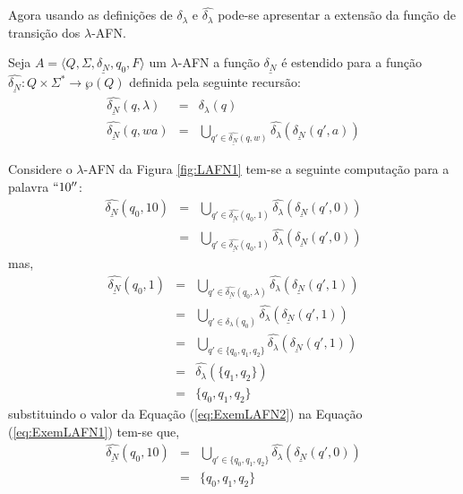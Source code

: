 Agora usando as definições de $\delta_\lambda$ e $\widehat{\delta_\lambda}$ pode-se apresentar a extensão da função de transição dos $\lambda$-AFN.

\begin{definition}\label{def:FuncaoLDeltaNDEstendida}
	Seja $A = \langle Q, \Sigma, \underline{\delta_N}, q_0, F\rangle$  um $\lambda$-AFN a função $\underline{\delta_N}$ é estendido para a função $\widehat{\underline{\delta_N}}: Q \times \Sigma^* \rightarrow \wp(Q)$ definida pela seguinte recursão:
	\begin{eqnarray}\label{eq:FuncaoLDeltaNDEstendida}
		\widehat{\underline{\delta_N}}(q, \lambda)& = &  \delta_\lambda(q)\\
		\widehat{\underline{\delta_N}}(q, wa) & = & \bigcup_{q' \in \widehat{\underline{\delta_N}}(q, w)} \widehat{\delta_\lambda}(\underline{\delta_N}(q', a))
	\end{eqnarray}
\end{definition}

\begin{example}
	Considere o $\lambda$-AFN da Figura \ref{fig:LAFN1} tem-se a seguinte computação para a palavra $``10''$:
	\begin{eqnarray}\label{eq:ExemLAFN1}
		\widehat{\underline{\delta_N}}(q_0, 10) & = & \bigcup_{q' \in \widehat{\underline{\delta_N}}(q_0, 1)} \widehat{\delta_\lambda}(\underline{\delta_N}(q', 0))\nonumber\\
		& = & \bigcup_{q' \in \widehat{\underline{\delta_N}}(q_0, 1)} \widehat{\delta_\lambda}(\underline{\delta_N}(q', 0))
	\end{eqnarray}
	mas,
	\begin{eqnarray}\label{eq:ExemLAFN2}
		\widehat{\underline{\delta_N}}(q_0, 1) & = & \bigcup_{q' \in \widehat{\underline{\delta_N}}(q_0, \lambda)} \widehat{\delta_\lambda}(\underline{\delta_N}(q', 1))\nonumber\\
		& = & \bigcup_{q' \in \delta_\lambda(q_0)} \widehat{\delta_\lambda}(\underline{\delta_N}(q', 1))\nonumber\\
		& = & \bigcup_{q' \in \{q_0, q_1, q_2\}} \widehat{\delta_\lambda}(\underline{\delta_N}(q', 1))\\
		& = & \widehat{\delta_\lambda}(\{q_1, q_2\})\nonumber\\
		& = & \{q_0, q_1, q_2\}\nonumber
	\end{eqnarray}
	substituindo o valor da Equação (\ref{eq:ExemLAFN2}) na Equação (\ref{eq:ExemLAFN1}) tem-se que, 
	\begin{eqnarray*}
		\widehat{\underline{\delta_N}}(q_0, 10) & = & \bigcup_{q' \in \{q_0, q_1, q_2\}} \widehat{\delta_\lambda}(\underline{\delta_N}(q', 0))\\
		& = & \{q_0, q_1, q_2\}
	\end{eqnarray*}
\end{example}

